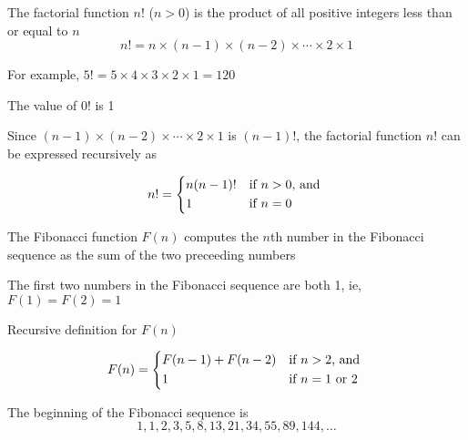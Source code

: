 \documentclass[8pt,a4paper,compress]{beamer}
\begin{document}
\begin{frame}[fragile]
\pause\transdissolve

The factorial function $n!$ ($n > 0$) is the product of all positive integers less than or equal to $n$ $$n! = n \times (n - 1) \times (n - 2) \times \cdots \times 2 \times 1$$

\pause\transdissolve\bigskip

For example, $5! = 5 \times 4 \times 3 \times 2 \times 1 = 120$

\pause\transdissolve\bigskip

The value of $0!$ is 1

\pause\transdissolve\bigskip

Since $(n - 1) \times (n - 2) \times \cdots \times 2 \times 1$ is $(n - 1)!$, the factorial function $n!$ can be expressed recursively as

\[
n! = \begin{dcases*}
n(n-1)! & if $n > 0$, and \\
1       & if $n = 0$
\end{dcases*}
\]
\end{frame}

\begin{frame}[fragile]
\pause\transdissolve

The Fibonacci function $F(n)$ computes the $n$th number in the Fibonacci sequence as the sum of the two preceeding numbers

\pause\transdissolve\bigskip

The first two numbers in the Fibonacci sequence are both 1, ie, $F(1) = F(2) = 1$

\pause\transdissolve\bigskip

Recursive definition for $F(n)$

\[
F(n) = \begin{dcases*}
F(n - 1) + F(n - 2) & if $n > 2$, and \\
1       & if $n = 1$ or $2$
\end{dcases*}
\]

\pause\transdissolve\bigskip

The beginning of the Fibonacci sequence is
$$1, 1, 2, 3, 5, 8, 13, 21, 34, 55, 89, 144, \dots$$
\end{frame}
\end{document}
